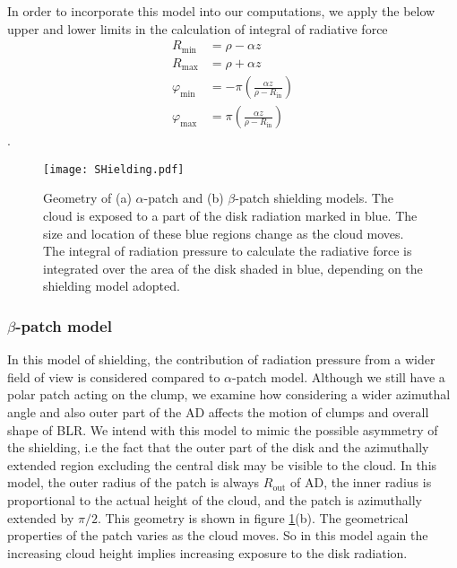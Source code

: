 \documentclass[twocolumn]{aastex62}
\begin{document}
In order to incorporate this model into our computations, we apply the below upper and lower limits in the calculation of integral of radiative force
\begin{equation}\label{eq:alphapatch}
\begin{array}{ll}
R_{\mathrm{min}} & = \rho - \alpha z  \\
R_{\mathrm{max}} & = \rho + \alpha z  \\
\varphi_{\mathrm{min}} & = - \pi \left( \frac{\alpha z}{\rho - R_{\mathrm{in}}}\right) \\
\varphi_{\mathrm{max}} & =  \pi \left( \frac{\alpha z}{\rho - R_{\mathrm{in}}}\right)
\end{array}
\end{equation}.

\begin{figure}
	\centering
	\texttt{[image: SHielding.pdf]}
	\caption{Geometry of (a) $\alpha$-patch and (b) $\beta$-patch shielding models. The cloud is exposed to a part of the disk radiation marked in blue. The size and location of these blue regions change as the cloud moves. The integral of radiation pressure to calculate the radiative force is integrated over the area of the disk shaded in blue, depending on the shielding model adopted.}
	\label{fig:SHgeometery}
\end{figure}

\subsubsection{$\beta$-patch model}

In this model of shielding, the contribution of radiation pressure from a wider field of view is considered compared to $\alpha$-patch model. Although we still have a polar patch acting on the clump, we examine how considering a wider azimuthal angle and also outer part of the AD affects the motion of clumps and overall shape of BLR. We intend with this model to mimic the possible asymmetry of the shielding, i.e the fact that the outer part of the disk and the azimuthally extended region excluding the central disk may be visible to the cloud. In this model, the outer radius of the patch is always $R_{\mathrm{out}}$ of AD, the inner radius is proportional to the actual height of the cloud, and the patch is azimuthally extended by $\pi/2$. This geometry is shown in figure \ref{fig:SHgeometery}(b). The geometrical properties of the patch varies as the cloud moves.
So in this model again the increasing cloud height implies increasing exposure to the disk radiation.
\end{document}
